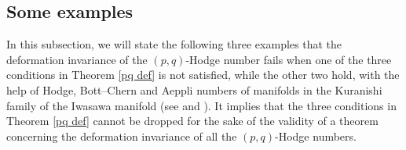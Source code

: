\documentclass[12pt]{amsart}
\numberwithin{equation}{section}
\theoremstyle{definition}
\theoremstyle{definition}
\theoremstyle{definition}
\renewcommand{\1}{\mathsf{1}}
\renewcommand{\>}{\rightarrow}
\theoremstyle{plain} %
\theoremstyle{plain} %
\theoremstyle{plain} %
\begin{document}
	
	
	\subsection{Some examples}\label{basic strategy}
	
In this subsection,  we will state the following three examples that the deformation invariance of the $(p,q)$-Hodge number fails when one of the three conditions in Theorem \ref{pq def} is not satisfied, while the other two hold, with the help of Hodge,
	Bott--Chern and Aeppli numbers of manifolds in the Kuranishi family of the Iwasawa manifold (see \cite[Appendix]{Ag13} and \cite[Section 1.c]{Sc07}). It implies that the three
	conditions  in Theorem  \ref{pq def}  cannot be dropped for the sake of the validity of a theorem  concerning the deformation invariance
	of all the $(p,q)$-Hodge numbers.
\end{document}
